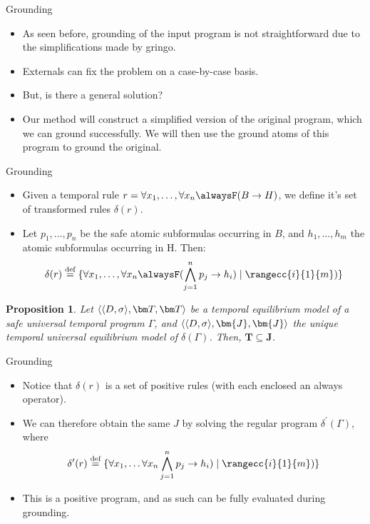 \documentclass[aspectratio=169,xcolor=svgnames]{beamer}
\theoremstyle{theoremstyle_space}
\newtheorem{proposition}{Proposition}
\begin{document}
\begin{frame}[t]{Grounding}
  \begin{itemize}
  \item As seen before, grounding of the input program is not
    straightforward due to the simplifications made by gringo.
  \item Externals can fix the problem on a case-by-case basis.
  \item But, is there a general solution?
  \item Our method will construct a simplified version of the original
    program, which we can ground successfully. We will then use the
    ground atoms of this program to ground the original.
  \end{itemize}
\end{frame}

\begin{frame}[t]{Grounding}
  \begin{itemize}
  \item Given a temporal rule
    $r=\forall x_1, \dots, \forall x_n \alwaysF(B \rightarrow H)$, we define
    it's set of transformed rules $\delta(r)$.
  \item Let $p_1,\dots, p_n$ be the safe atomic subformulas occurring
    in $B$, and $h_1, \dots, h_m$ the atomic subformulas occurring in
    H. Then:
\begin{equation*} \delta(r) \defeq \{ \forall x_1, \dots, \forall x_n
\alwaysF(\bigwedge_{j=1}^{n}p_j \rightarrow h_i) \mid
\rangecc{i}{1}{m})\}
\end{equation*}
  \end{itemize}

\begin{proposition}\label{prop:simplified-facts}
  Let $\qttandt$ be a temporal equilibrium model of a safe universal
  temporal program $\Gamma$, and
  $\langle \dsigma, \bm{J},\bm{J} \rangle$ the unique temporal
  universal equilibrium model of $\delta(\Gamma)$. Then,
  $\bm{T} \subseteq \bm{J}$.
\end{proposition}
\end{frame}

\begin{frame}[t]{Grounding}
  \begin{itemize}
  \item Notice that $\delta(r)$ is a set of positive rules (with each
    enclosed an always operator).
  \item We can therefore obtain the same $J$ by solving the regular
    program $\delta^{\prime}(\Gamma)$, where
\begin{equation*} \delta^{\prime}(r) \defeq \{ \forall x_1, \dots \forall x_n
  \bigwedge_{j=1}^{n}p_j \rightarrow h_i) \mid \rangecc{i}{1}{m})\}
\end{equation*}
  \item This is a positive program, and as such can be fully evaluated during grounding.
  \end{itemize}
\end{frame}
\end{document}
